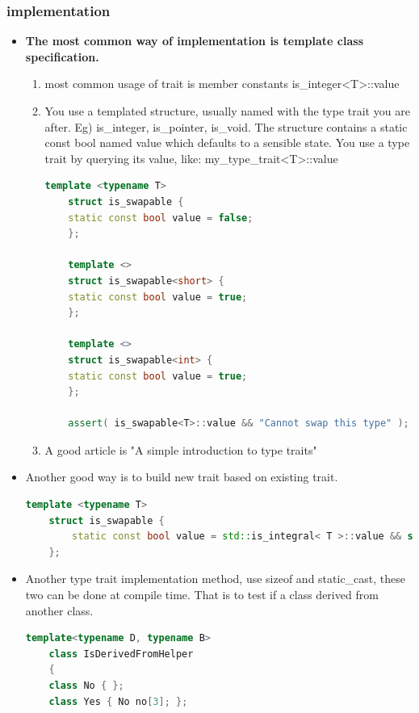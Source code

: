 \documentclass[a4paper,12pt,twoside]{book}
\begin{document}
\subsubsection{implementation}
\begin{itemize}
	\item \textbf{The most common way of implementation is template class specification.}
	\begin{enumerate}
	\item most common usage of trait is member constants is\_integer<T>::value
	
	\item You use a templated structure, usually named with the type trait you are after. Eg) is\_integer, is\_pointer, is\_void. The structure contains a static const bool named value which defaults to a sensible state. You use a type trait by querying its value, like: my\_type\_trait<T>::value
		
	
	\begin{lstlisting}[frame=single, language=c++]
	template <typename T>
	struct is_swapable {
	static const bool value = false;
	};
	
	template <>
	struct is_swapable<short> {
	static const bool value = true;
	};
	
	template <>
	struct is_swapable<int> {
	static const bool value = true;
	};
	
	assert( is_swapable<T>::value && "Cannot swap this type" );
	\end{lstlisting}
	\item A good article is "A simple introduction to type traits"
	\end{enumerate}

\item Another good way is to build new trait based on existing trait.
	\begin{lstlisting}[frame=single, language=c++]
	template <typename T>
	struct is_swapable {
		static const bool value = std::is_integral< T >::value && sizeof( T ) >= 2;
	};
	\end{lstlisting}
	
	\item Another type trait implementation method, use sizeof and static\_cast, these two can be done at compile time. That is to test if a class derived from another class.
	\begin{lstlisting}[frame=single, language=c++]
	template<typename D, typename B>
	class IsDerivedFromHelper
	{
	class No { };
	class Yes { No no[3]; };
	

\end{lstlisting}
\end{itemize}
\end{document}
